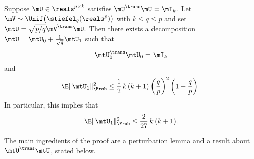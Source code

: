 \begin{proposition}\label{P:project-kframe}
    Suppose $\mU \in \reals^{p \times k}$ satisfies $\mU^\trans \mU = \mI_k$.
    Let $\mV \sim \Unif\big( \stiefel_q(\reals^p) \big)$ with 
    $k \leq q \leq p$ and set
    \(
        \mtU = \sqrt{p/q} \mV^\trans \mU.
    \)
    Then there exists a decomposition 
    $\mtU = \mtU_0 + \frac{1}{\sqrt{q}} \mtU_1$ such that
    \[
        \mtU_0^\trans \mtU_0 = \mI_k
    \]
    and
    \[
        \E \| \mtU_1 \|_\Frob^2 
            \leq
                \frac{1}{2} \,
                k \, (k + 1)
                \left( \frac{q}{p} \right)^2
                \left( 1 - \frac{q}{p} \right).
    \]
    In particular, this implies that
    \[
        \E \| \mtU_1 \|_\Frob^2 
            \leq \frac{2}{27} \, k \, (k+1).
    \]
\end{proposition}

\noindent
The main ingredients of the proof are a perturbation lemma and a result about $\mtU^\trans \mtU$, stated below.

